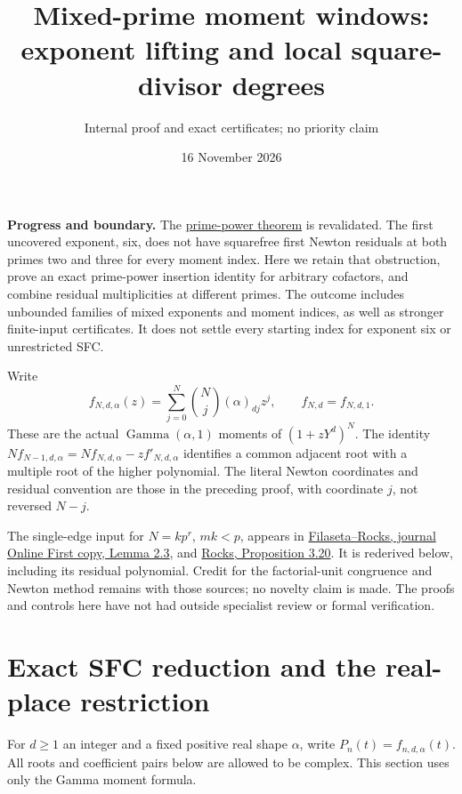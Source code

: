 \documentclass[11pt]{article}
\title{Mixed-prime moment windows: exponent lifting and local square-divisor degrees}
\author{Internal proof and exact certificates; no priority claim}
\date{16 November 2026}
\begin{document}
\maketitle
\noindent\textbf{Progress and boundary.}
The \href{PRIME_POWER_TWO_TERM_SFC.tex}{prime-power theorem} is revalidated.
The first uncovered exponent, six, does not have squarefree first Newton
residuals at both primes two and three for every moment index. Here we
retain that obstruction, prove an exact prime-power insertion identity for
arbitrary cofactors, and combine residual multiplicities at different primes.
The outcome includes unbounded families of mixed exponents and moment
indices, as well as stronger finite-input certificates. It does not settle
every starting index for exponent six or unrestricted SFC.

Write
\[
 f_{N,d,\alpha}(z)=\sum_{j=0}^N\binom Nj(\alpha)_{dj}z^j,
 \qquad f_{N,d}=f_{N,d,1}.
\]
These are the actual $\operatorname{Gamma}(\alpha,1)$ moments of
$(1+zY^d)^N$. The identity
$Nf_{N-1,d,\alpha}=Nf_{N,d,\alpha}-z f'_{N,d,\alpha}$ identifies a
common adjacent root with a multiple root of the higher polynomial.
The literal Newton coordinates and residual convention are those in the
preceding proof, with coordinate $j$, not reversed $N-j$.

The single-edge input for $N=kp^r$, $mk<p$, appears in
\href{sources/filaseta-rocks-2016-published.pdf}{Filaseta--Rocks,
journal Online First copy, Lemma 2.3}, and
\href{sources/rocks-2015-author-preprint.pdf}{Rocks, Proposition 3.20}.
It is rederived below, including its residual polynomial. Credit for the
factorial-unit congruence and Newton method remains with those sources;
no novelty claim is made. The proofs and controls here have not had
outside specialist review or formal verification.

\section{Exact SFC reduction and the real-place restriction}
For $d\geq1$ an integer and a fixed positive real shape $\alpha$, write
$P_n(t)=f_{n,d,\alpha}(t)$. All roots and coefficient pairs below are
allowed to be complex. This section uses only the Gamma moment formula.
\end{document}
